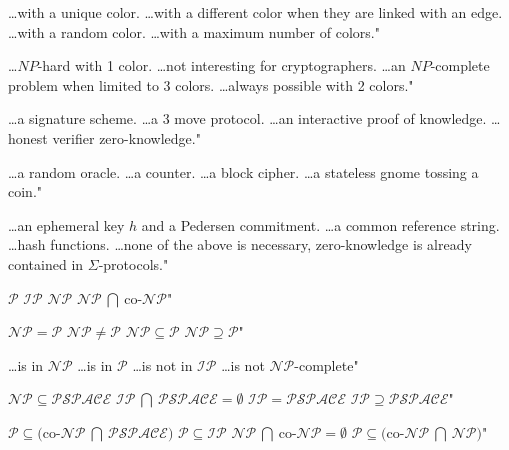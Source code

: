 {\ldots with a unique color.}
{\ldots with a different color when they are linked with an edge.}
{\ldots with a random color.}
{\ldots with a maximum number of colors."}

{\ldots $NP$-hard with 1 color.}
{\ldots not interesting for cryptographers.}
{\ldots an $NP$-complete problem when limited to 3 colors.}
{\ldots always possible with 2 colors."}

{\ldots a signature scheme.}
{\ldots a 3 move protocol.}
{\ldots an interactive proof of knowledge.}
{\ldots honest verifier zero-knowledge."}

{\ldots a random oracle.}
{\ldots a counter.}
{\ldots a block cipher.}
{\ldots a stateless gnome tossing a coin."}

{\ldots an ephemeral key $h$ and a Pedersen commitment.}
{\ldots a common reference string.}
{\ldots hash functions.}
{\ldots none of the above is necessary, zero-knowledge is already contained in $\Sigma$-protocols."}

{$\mathcal{P}$}
{$\mathcal{IP}$}
{$\mathcal{NP}$}
{$\mathcal{NP}\ \bigcap\ $co-$\mathcal{NP}$"}

{$\mathcal{NP} = \mathcal{P}$}
{$\mathcal{NP}\neq \mathcal{P}$}
{$\mathcal{NP}\subseteq \mathcal{P}$}
{$\mathcal{NP}\supseteq \mathcal{P}$"}

{\ldots is in $\mathcal{NP}$}
{\ldots is in $\mathcal{P}$}
{\ldots is not in $\mathcal{IP}$}
{\ldots is not $\mathcal{NP}$-complete"}

{$\mathcal{NP} \subseteq \mathcal{PSPACE}$}
{$\mathcal{IP}\ \bigcap\ \mathcal{PSPACE} = \emptyset$}
{$\mathcal{IP} = \mathcal{PSPACE}$}
{$\mathcal{IP} \supseteq \mathcal{PSPACE}$"}

{$\mathcal{P} \subseteq ($co-$\mathcal{NP}\ \bigcap\ \mathcal{PSPACE})$}
{$\mathcal{P} \subseteq \mathcal{IP}$}
{$\mathcal{NP}\ \bigcap\ $co-$\mathcal{NP}=\emptyset$}
{$\mathcal{P} \subseteq ($co-$\mathcal{NP}\ \bigcap\ \mathcal{NP})$"}

